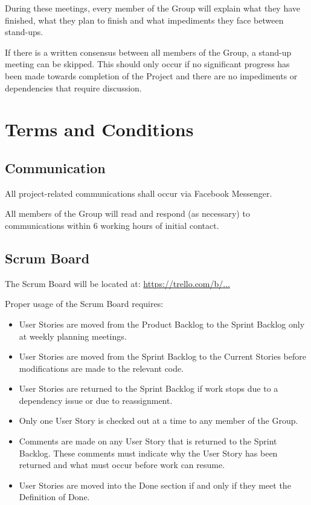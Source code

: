 \documentclass[a4paper,12pt]{article} %
\begin{document}
During these meetings, every member of the Group will explain what they have finished, what they plan to finish and what impediments they face between stand-ups. 

If there is a written consensus between all members of the Group, a stand-up meeting can be skipped. This should only occur if no significant progress has been made towards completion of the Project and there are no impediments or dependencies that require discussion.



\section{Terms and Conditions}

\subsection{Communication}

All project-related communications shall occur via Facebook Messenger.

All members of the Group will read and respond (as necessary) to communications within 6 working hours of initial contact.

\subsection{Scrum Board}

The Scrum Board will be located at: \url{https://trello.com/b/...}

Proper usage of the Scrum Board requires:
\begin{itemize}
	\item User Stories are moved from the Product Backlog to the Sprint Backlog only at weekly planning meetings.
	\item User Stories are moved from the Sprint Backlog to the Current Stories before modifications are made to the relevant code.
	\item User Stories are returned to the Sprint Backlog if work stops due to a dependency issue or due to reassignment.
	\item Only one User Story is checked out at a time to any member of the Group.
	\item Comments are made on any User Story that is returned to the Sprint Backlog. These comments must indicate why the User Story has been returned and what must occur before work can resume.
	\item User Stories are moved into the Done section if and only if they meet the Definition of Done.
\end{itemize}
\end{document}
